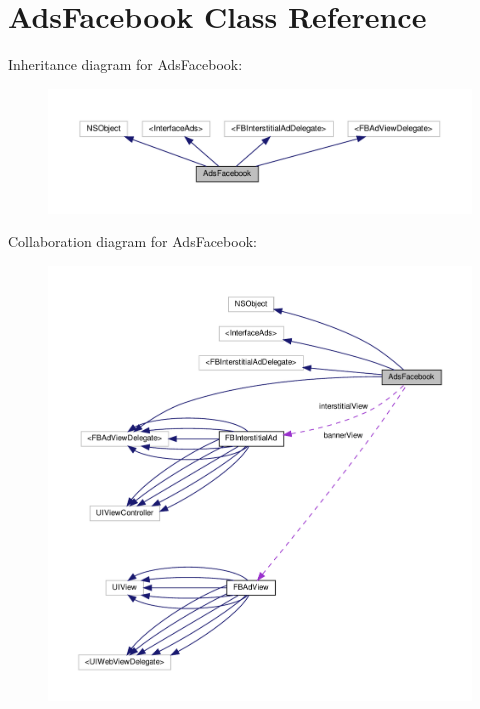 \hypertarget{interfaceAdsFacebook}{}\section{Ads\+Facebook Class Reference}
\label{interfaceAdsFacebook}


Inheritance diagram for Ads\+Facebook\+:
\nopagebreak
\begin{figure}[H]
\begin{center}
\leavevmode
\includegraphics[width=350pt]{interfaceAdsFacebook__inherit__graph}
\end{center}
\end{figure}


Collaboration diagram for Ads\+Facebook\+:
\nopagebreak
\begin{figure}[H]
\begin{center}
\leavevmode
\includegraphics[width=350pt]{interfaceAdsFacebook__coll__graph}
\end{center}
\end{figure}
